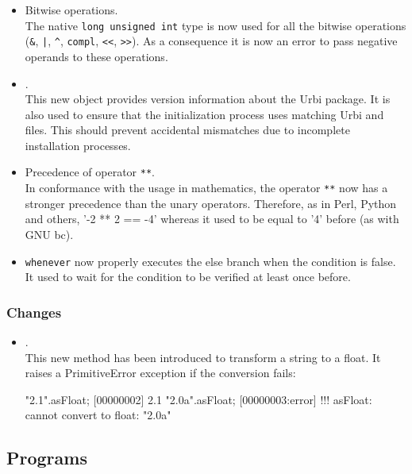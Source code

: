 \begin{itemize}
\item Bitwise operations.\\
  The native \lstinline{long unsigned int} type is now used for all the
  bitwise operations (\lstinline|&|, \lstinline{|}, \lstinline|^|,
  \lstinline|compl|, \lstinline|<<|, \lstinline|>>|).  As a consequence it
  is now an error to pass negative operands to these operations.

\item {}.\\
  This new object provides version information about the Urbi package.  It
  is also used to ensure that the initialization process uses matching Urbi
  and \Cxx files.  This should prevent accidental mismatches due to
  incomplete installation processes.

\item Precedence of operator \lstinline|**|.\\
  In conformance with the usage in mathematics, the operator \lstinline|**|
  now has a stronger precedence than the unary operators.  Therefore, as in
  Perl, Python and others, '-2 ** 2 == -4' whereas it used to be equal to
  '4' before (as with GNU bc).

\item \lstinline|whenever| now properly executes the else branch when the
  condition is false.  It used to wait for the condition to be verified at
  least once before.
\end{itemize}

\subsubsection{Changes}

\begin{itemize}
\item {}.\\
  This new method has been introduced to transform a string to a float.  It
  raises a PrimitiveError exception if the conversion fails:

\begin{urbiscript}
"2.1".asFloat;
[00000002] 2.1
"2.0a".asFloat;
[00000003:error] !!! asFloat: cannot convert to float: "2.0a"
\end{urbiscript}
\end{itemize}

\subsection{Programs}

